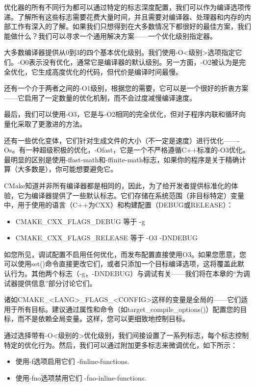 优化器的所有不同行为都可以通过特定的标志深度配置，我们可以作为编译选项传递。了解所有这些标志需要花费大量时间，并且需要对编译器、处理器和内存的内部工作有深入的了解。如果我们只想得到在大多数情况下都很好的最佳方案，我们能做什么？我们可以寻求一个通用解决方案——一个优化级别指定器。

大多数编译器提供从0到3的四个基本优化级别。我们使用-O<级别>选项指定它们。-O0表示没有优化，通常它是编译器的默认级别。另一方面，-O2被认为是完全优化，它生成高度优化的代码，但代价是编译时间最慢。

还有一个介于两者之间的-O1级别，根据您的需要，它可以是一个很好的折衷方案——它启用了一定数量的优化机制，而不会过度减慢编译速度。

最后，我们可以使用-O3，它是与-O2相同的完全优化，但对子程序内联和循环向量化采取了更激进的方法。

还有一些优化变体，它们针对生成文件的大小（不一定是速度）进行优化——-Os。有一种超级积极的优化，-Ofast，它是一个不严格遵循C++标准的-O3优化。最明显的区别是使用-ffast-math和-ffinite-math标志，如果你的程序是关于精确计算（大多数是），你可能想要避免它。

CMake知道并非所有编译器都是相同的，因此，为了给开发者提供标准化的体验，它为编译器提供了一些默认标志。它们存储在系统范围（非目标特定）变量中，用于使用的语言（C++为CXX）和构建配置（DEBUG或RELEASE）：

\begin{itemize}
\item
CMAKE\_CXX\_FLAGS\_DEBUG 等于 -g

\item
CMAKE\_CXX\_FLAGS\_RELEASE 等于 -O3 -DNDEBUG
\end{itemize}

如您所见，调试配置不启用任何优化，而发布配置直接使用O3。如果您愿意，您可以使用set()命令直接更改它们，或者只添加一个目标编译选项，这将覆盖此默认行为。其他两个标志（-g，-DNDEBUG）与调试有关——我们将在本章的“为调试器提供信息”部分讨论它们。

诸如CMAKE\_<LANG>\_FLAGS\_<CONFIG>这样的变量是全局的——它们适用于所有目标。建议通过属性和命令（如target\_compile\_options()）配置您的目标，而不是依赖全局变量。这样，您可以更细致地控制目标。

通过选择带有-O<级别的>优化级别，我们间接设置了一系列标志，每个标志控制特定的优化行为。然后，我们可以通过附加更多标志来微调优化，如下所示：

\begin{itemize}
\item
使用-f选项启用它们 -finline-functions.

\item
使用-fno选项禁用它们 -fno-inline-functions.
\end{itemize}

